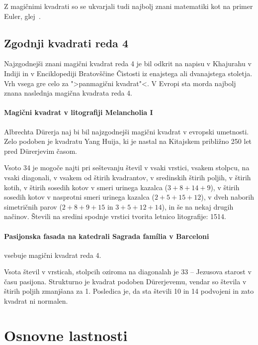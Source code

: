 \documentclass[a4paper,12pt]{article}
\begin{document}
Z magičnimi kvadrati so se ukvarjali tudi najbolj znani matematiki kot na
primer Euler, glej~\cite{euler}. %


\subsection{Zgodnji kvadrati reda 4}

Najzgodnejši znani magični kvadrat reda 4 je bil odkrit na napisu
v Khajurahu v Indiji in v Enciklopediji Bratovščine Čistosti iz enajstega
ali dvanajstega stoletja. Vrh vsega gre celo za ">panmagični kvadrat"<.
V Evropi sta morda najbolj znana naslednja magična kvadrata reda 4.

\paragraph{Magični kvadrat v litografiji Melancholia I}
Albrechta Dürerja naj bi bil najzgodnejši magični kvadrat
v evropski umetnosti. Zelo podoben je kvadratu Yang Huija, ki je nastal na Kitajskem
približno 250 let pred Dürerjevim časom.

Vsoto 34 je mogoče najti pri seštevanju števil v vsaki vrstici, vsakem stolpcu,
na vsaki diagonali, v vsakem od štirih kvadrantov, v sredinskih štirih poljih,
v štirih kotih, v štirih sosedih kotov v smeri urinega kazalca (\(3+8+14+9\)), v
štirih sosedih kotov v nasprotni smeri urinega kazalca (\(2+5+15+12\)), v dveh naborih
simetričnih parov (\(2+8+9+15\) in \(3+5+12+14\)), in še na nekaj drugih načinov.
Števili na sredini spodnje vrstici tvorita letnico litografije: 1514.

\paragraph{Pasijonska fasada na katedrali Sagrada família v Barceloni}
vsebuje magični kvadrat reda 4.

Vsota števil v vrsticah, stolpcih oziroma na diagonalah je 33 -- Jezusova starost
v času pasijona. Strukturno je kvadrat podoben Dürerjevemu, vendar so števila
v štirih poljih zmanjšana za 1. Posledica je, da sta števili 10 in 14 podvojeni
in zato kvadrat ni normalen.


\section{Osnovne lastnosti}
\end{document}
